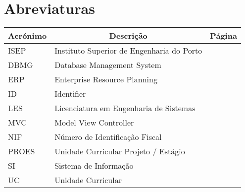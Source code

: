 

\chapter[Abreviaturas]{Abreviaturas}

\begin{center}
\small
\begin{longtable}{lp{3.0in}c}
\toprule \multicolumn{1}{c}{Acrónimo} 
                & \multicolumn{1}{c}{Descrição}
                                & \multicolumn{1}{c}{Página}\\ \midrule\addlinespace[2pt] \endhead

\bottomrule\endfoot

ISEP	& Instituto Superior de Engenharia do Porto	& \\
DBMG	& Database Management System				& \pageref{sym:DBMG}\\
ERP		& Enterprise Resource Planning				& \pageref{sym:ERP}\\
ID		& Identifier								& \pageref{sym:ID}\\
LES		& Licenciatura em Engenharia de Sistemas	& \pageref{sym:LES}\\
MVC		& Model View Controller						& \pageref{sym:MVC}\\
NIF		& Número de Identificação Fiscal			& \pageref{sym:NIF}\\
PROES	& Unidade Curricular Projeto / Estágio		& \pageref{sym:PROES}\\
SI		& Sistema de Informação						& \pageref{sym:SI}\\
UC		& Unidade Curricular						& \pageref{sym:UC}\\


\end{longtable}

\end{center}

